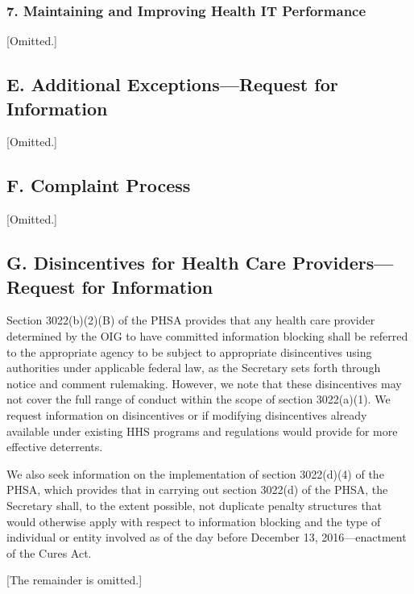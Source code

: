 \documentclass[twoside,11pt]{article}
\begin{document}
          \subsubsection{7. Maintaining and Improving Health IT Performance}

[Omitted.]

          \subsection{E. Additional Exceptions—Request for Information}

[Omitted.]

          \subsection{F. Complaint Process}

[Omitted.]

          \subsection{G. Disincentives for Health Care Providers—Request for Information}

          Section 3022(b)(2)(B) of the PHSA provides that any health care provider determined by the OIG to have committed information blocking shall be referred to the appropriate agency to be subject to appropriate disincentives using authorities under applicable federal law, as the Secretary sets forth through notice and comment rulemaking. However, we note that these disincentives may not cover the full range of conduct within the scope of section 3022(a)(1). We request information on disincentives or if modifying disincentives already available under existing HHS programs and regulations would provide for more effective deterrents.


          We also seek information on the implementation of section 3022(d)(4) of the PHSA, which provides that in carrying out section 3022(d) of the PHSA, the Secretary shall, to the extent possible, not duplicate penalty structures that would otherwise apply with respect to information blocking and the type of individual or entity involved as of the day before December 13, 2016—enactment of the Cures Act.


[The remainder is omitted.]
          
      
\end{document}
